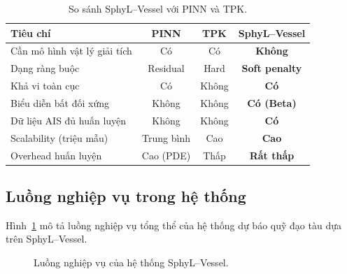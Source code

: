 \documentclass{IEEEtran}
\begin{document}
\begin{table}[htbp]
\centering
\caption{So sánh SphyL--Vessel với PINN và TPK.}
\label{tab:pinn-tpk-comparison}
\begin{tabular}{p{3.0cm}ccc}
\toprule
Tiêu chí                  & PINN       & TPK        & SphyL--Vessel \\
\midrule
Cần mô hình vật lý giải tích & Có         & Có         & \textbf{Không} \\
Dạng ràng buộc             & Residual   & Hard       & \textbf{Soft penalty} \\
Khả vi toàn cục            & Có         & Không      & \textbf{Có}     \\
Biểu diễn bất đối xứng     & Không      & Không      & \textbf{Có (Beta)} \\
Dữ liệu AIS đủ huấn luyện  & Không      & Không      & \textbf{Có}     \\
Scalability (triệu mẫu)    & Trung bình & Cao        & \textbf{Cao}     \\
Overhead huấn luyện        & Cao (PDE)  & Thấp       & \textbf{Rất thấp} \\
\bottomrule
\end{tabular}
\end{table}

\subsection{Luồng nghiệp vụ trong hệ thống}\label{sec:business-flow}

Hình~\ref{fig:business-flow} mô tả luồng nghiệp vụ tổng thể
của hệ thống dự báo quỹ đạo tàu dựa trên SphyL--Vessel.

\begin{figure}[H]
\centering
{}
\caption{Luồng nghiệp vụ của hệ thống SphyL--Vessel.}
\label{fig:business-flow}
\end{figure}
\end{document}
